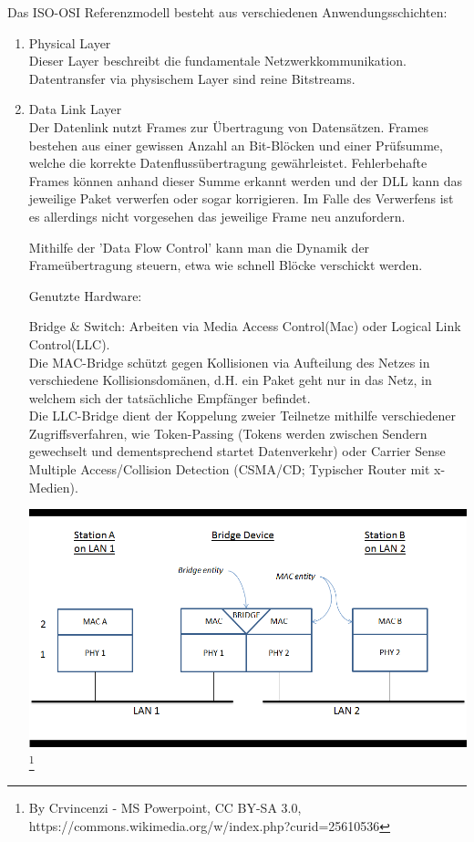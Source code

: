 \documentclass[11pt]{article}
\begin{document}
    Das ISO-OSI Referenzmodell besteht aus verschiedenen Anwendungsschichten:
    \begin{enumerate}
        \item Physical Layer\\
        Dieser Layer beschreibt die fundamentale Netzwerkkommunikation. Datentransfer via
        physischem Layer sind reine Bitstreams.
        \item Data Link Layer\\
        Der Datenlink nutzt Frames zur Übertragung von Datensätzen. Frames bestehen aus einer gewissen Anzahl
        an Bit-Blöcken und einer Prüfsumme, welche die korrekte Datenflussübertragung gewährleistet.
        Fehlerbehafte Frames können anhand dieser Summe erkannt werden und der DLL kann das jeweilige Paket verwerfen
        oder sogar korrigieren.
        Im Falle des Verwerfens ist es allerdings nicht vorgesehen das jeweilige Frame neu anzufordern.

        Mithilfe der 'Data Flow Control' kann man die Dynamik der Frameübertragung steuern, etwa wie schnell
        Blöcke verschickt werden.

        Genutzte Hardware:
        \begin{addmargin}[1em]{1em} %
            Bridge \& Switch: Arbeiten via Media Access Control(Mac) oder Logical Link Control(LLC).\\
            Die MAC-Bridge schützt gegen Kollisionen via Aufteilung des Netzes in verschiedene Kollisionsdomänen, d.H.
            ein Paket geht nur in das Netz, in welchem sich der tatsächliche Empfänger befindet.\\
            Die LLC-Bridge dient der Koppelung zweier Teilnetze mithilfe verschiedener Zugriffsverfahren, wie
            Token-Passing (Tokens werden zwischen Sendern gewechselt und dementsprechend startet Datenverkehr) oder
            Carrier Sense Multiple Access/Collision Detection (CSMA/CD; Typischer Router mit x-Medien).\\
        \end{addmargin}

        \includegraphics[width=\textwidth]{Network_Bridging.png}
        \footnote[1\small \emph{Schemata of Bridge/Switch inside a Network}]{By Crvincenzi - MS Powerpoint, CC BY-SA 3.0, https://commons.wikimedia.org/w/index.php?curid=25610536}


\end{enumerate}
\end{document}
